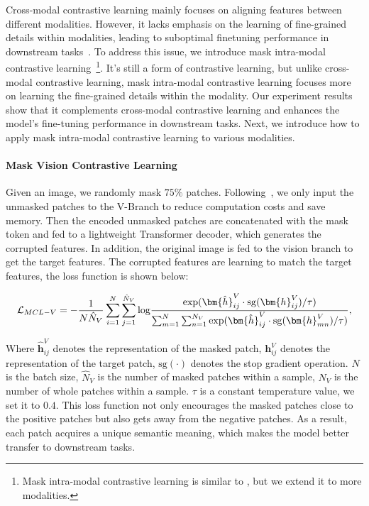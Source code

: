 Cross-modal contrastive learning mainly focuses on aligning features between different modalities. 
However, it lacks emphasis on the learning of fine-grained details within modalities, leading to suboptimal finetuning performance in  downstream tasks~\cite{fd-clip}. 
To address this issue, we introduce mask intra-modal contrastive learning~\footnote{Mask intra-modal contrastive learning is similar to \cite{conmim}, but we extend it to more modalities.}.
It's still a form of contrastive learning, but unlike cross-modal contrastive learning, mask intra-modal contrastive learning focuses more on learning the fine-grained details within the modality.
Our experiment results show that it complements cross-modal contrastive learning and enhances the model's fine-tuning performance in downstream tasks. 
Next, we introduce how to apply mask intra-modal contrastive learning to various modalities.

\paragraph{Mask Vision Contrastive Learning}
Given an image, we randomly mask $75\%$ patches. Following~\cite{mae}, we only input the unmasked patches to the V-Branch to reduce computation costs and save memory. 
Then the encoded unmasked patches are concatenated with the mask token and fed to a lightweight Transformer decoder, which generates the corrupted features. 
In addition, the original image is fed to the vision branch to get the target features.
The corrupted features are learning to match the target features, the loss function is shown below:

\begin{equation}
\label{eq:mcl_v}
\mathcal{L}_{MCL-V} = -\frac{1}{N\hat{N}_V}\sum_{i=1}^{N}\sum_{j=1}^{\hat{N}_V}{\rm log}\frac{{\rm exp}(\bm{\hat{h}}_{ij}^V \cdot {\rm sg}(\bm{h}_{ij}^V)/\tau)}{\sum_{m=1}^{N}\sum_{n=1}^{N_V}{\rm exp}(\bm{\hat{h}}_{ij}^V  \cdot {\rm sg}(\bm{h}_{mn}^V)/\tau)},
\end{equation}

Where $\bm{\hat{h}}_{ij}^V$ denotes the representation of the masked patch, $\bm{h}_{ij}^V$ denotes the representation of the target patch, $\text{sg}(\cdot)$ denotes the stop gradient operation. $N$ is the batch size, $\hat{N}_V$ is the number of masked patches within a sample, $N_V$ is the number of whole patches within a sample. $\tau$ is a constant temperature value, we set it to $0.4$. 
This loss function not only encourages the masked patches close to the positive patches but also gets away from the negative patches.
As a result, each patch acquires a unique semantic meaning, which makes the model better transfer to downstream tasks.~\cite{fd-clip}

